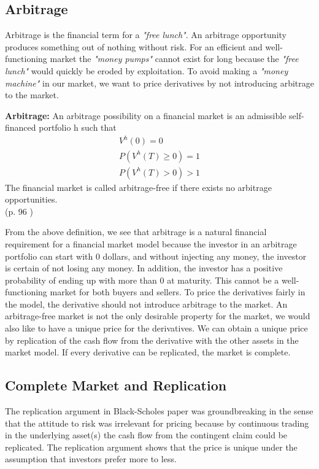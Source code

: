 \subsection{Arbitrage}
Arbitrage is the financial term for a \textsl{"free lunch"}. An arbitrage opportunity produces something out of nothing without risk. For an efficient and well-functioning market the \textsl{"money pumps"} cannot exist for long because the \textsl{"free lunch"} would quickly be eroded by exploitation. To avoid making a \textsl{"money machine"} in our market, we want to price derivatives by not introducing arbitrage to the market.  
\theoremstyle{definition}
\begin{definition}{\textbf{Arbitrage: }}\label{Arbitrage}
An arbitrage possibility on a financial market is an admissible self-financed portfolio h such that
\begin{equation*}
\begin{split}
V^{h}(0)=0\\
P(V^{h}(T)\geq 0)=1\\
P(V^{h}(T)>0)>1
\end{split}
\end{equation*}
The financial market is called arbitrage-free if there exists no arbitrage opportunities.\\
\null \hfill (p. 96 \parencite{finKont})
\end{definition}
From the above definition, we see that arbitrage is a natural financial requirement for a financial market model because the investor in an arbitrage portfolio can start with 0 dollars, and without injecting any money, the investor is certain of not losing any money. In addition, the investor has a positive probability of ending up with more than 0 at maturity. This cannot be a well-functioning market for both buyers and sellers. To price the derivatives fairly in the model, the derivative should not introduce arbitrage to the market. An arbitrage-free market is not the only desirable property for the market, we would also like to have a unique price for the derivatives. We can obtain a unique price by replication of the cash flow from the derivative with the other assets in the market model. If every derivative can be replicated, the market is complete. 


\subsection{Complete Market and Replication}
The replication argument in Black-Scholes paper \parencite{B-S-Paper} was groundbreaking in the sense that the attitude to risk was irrelevant for pricing because by continuous trading in the underlying asset(s) the cash flow from the contingent claim could be replicated. The replication argument shows that the price is unique under the assumption that investors prefer more to less.\\

